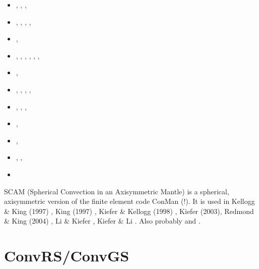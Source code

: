 \begin{small}
\begin{itemize}
                             \textcite{safa03},  \textcite{taki03}
\item[\twothousandfour]      \textcite{elhg04},  \textcite{shha04}, \textcite{reki04},
                             \textcite{nabs04}
\item[\twothousandfive]      \textcite{kogk05},  \textcite{colt05},
                             \textcite{mish05},  \textcite{shha05}, \textcite{tagu05}
\item[\twothousandsix]       \textcite{nake06},  \textcite{cosc06}
\item[\twothousandseven]     \textcite{nake07},  \textcite{dadh07}, \textcite{copb07},
                             \textcite{elki07},  \textcite{lohd07}, \textcite{nake07},
                             \textcite{reki07}
\item[\twothousandeight]     \textcite{hash08},  \textcite{dadh08}
\item[\twothousandnine]      \textcite{faho09},  \textcite{heaa09}, \textcite{king09}, 
                             \textcite{leki09},  \textcite{wazh09}
\item[\twothousandten]       \textcite{kilv10},  \textcite{cows10}, 
                             \textcite{hash10},  \textcite{leki10}
\item[\twothousandeleven]    \textcite{hash11},  \textcite{leki11}
\item[\twothousandfourteen]  \textcite{kile14},  \textcite{leli14}
\item[\twothousandfifteen]   \textcite{kifr15},  \textcite{kilk15}, \textcite{lile15}
\item[\twothousandtwentytwo] \textcite{gadm22}
\end{itemize}
\end{small}

SCAM (Spherical Convection in an Axisymmetric Mantle) is a spherical, axisymmetric version 
of the finite element code ConMan (!). It is used in Kellogg \& King (1997) \cite{keki97}, 
King (1997) \cite{king97}, Kiefer \& Kellogg (1998) \cite{kike98}, Kiefer (2003)\cite{kief03}, 
Redmond \& King (2004) \cite{reki04}, Li \& Kiefer \cite{liki07}, Kiefer \& Li \cite{kili16}.
Also probably \cite{fari94} and \cite{fari95}.

\section{ConvRS/ConvGS} 

